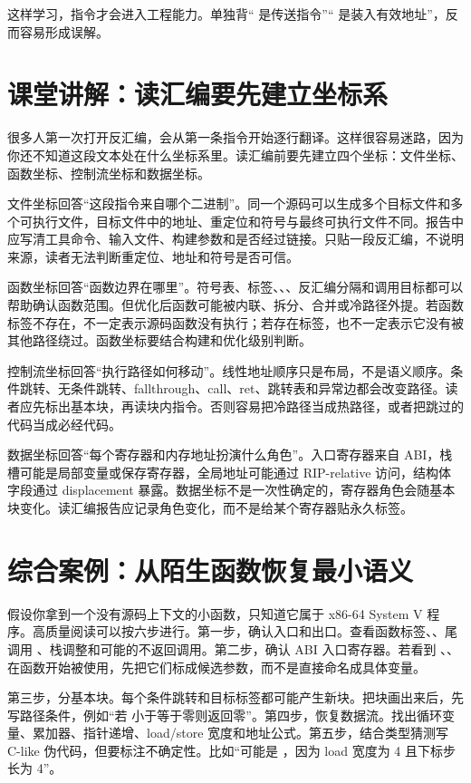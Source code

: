 这样学习，指令才会进入工程能力。单独背“ 是传送指令”“ 是装入有效地址”，反而容易形成误解。

\section{课堂讲解：读汇编要先建立坐标系}

很多人第一次打开反汇编，会从第一条指令开始逐行翻译。这样很容易迷路，因为你还不知道这段文本处在什么坐标系里。读汇编前要先建立四个坐标：文件坐标、函数坐标、控制流坐标和数据坐标。

文件坐标回答“这段指令来自哪个二进制”。同一个源码可以生成多个目标文件和多个可执行文件，目标文件中的地址、重定位和符号与最终可执行文件不同。报告中应写清工具命令、输入文件、构建参数和是否经过链接。只贴一段反汇编，不说明来源，读者无法判断重定位、地址和符号是否可信。

函数坐标回答“函数边界在哪里”。符号表、标签、、、反汇编分隔和调用目标都可以帮助确认函数范围。但优化后函数可能被内联、拆分、合并或冷路径外提。若函数标签不存在，不一定表示源码函数没有执行；若存在标签，也不一定表示它没有被其他路径绕过。函数坐标要结合构建和优化级别判断。

控制流坐标回答“执行路径如何移动”。线性地址顺序只是布局，不是语义顺序。条件跳转、无条件跳转、fallthrough、call、ret、跳转表和异常边都会改变路径。读者应先标出基本块，再读块内指令。否则容易把冷路径当成热路径，或者把跳过的代码当成必经代码。

数据坐标回答“每个寄存器和内存地址扮演什么角色”。入口寄存器来自 ABI，栈槽可能是局部变量或保存寄存器，全局地址可能通过 RIP-relative 访问，结构体字段通过 displacement 暴露。数据坐标不是一次性确定的，寄存器角色会随基本块变化。读汇编报告应记录角色变化，而不是给某个寄存器贴永久标签。

\section{综合案例：从陌生函数恢复最小语义}

假设你拿到一个没有源码上下文的小函数，只知道它属于 x86-64 System V 程序。高质量阅读可以按六步进行。第一步，确认入口和出口。查看函数标签、、尾调用 、栈调整和可能的不返回调用。第二步，确认 ABI 入口寄存器。若看到 、、 在函数开始被使用，先把它们标成候选参数，而不是直接命名成具体变量。

第三步，分基本块。每个条件跳转和目标标签都可能产生新块。把块画出来后，先写路径条件，例如“若  小于等于零则返回零”。第四步，恢复数据流。找出循环变量、累加器、指针递增、load/store 宽度和地址公式。第五步，结合类型猜测写 C-like 伪代码，但要标注不确定性。比如“可能是 ，因为 load 宽度为 4 且下标步长为 4”。

